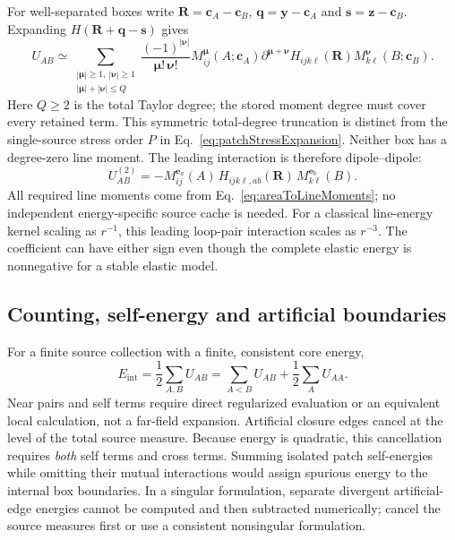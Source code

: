 For well-separated boxes write $\bm R=\bm c_A-\bm c_B$, $\bm q=\bm y-\bm c_A$ and $\bm s=\bm z-\bm c_B$. Expanding $H(\bm R+\bm q-\bm s)$ gives
\begin{equation}
 U_{AB}\simeq
 \sum_{\substack{|\boldsymbol\mu|\ge1,\ |\boldsymbol\nu|\ge1\\
 |\boldsymbol\mu|+|\boldsymbol\nu|\le Q}}
 \frac{(-1)^{|\boldsymbol\nu|}}{\boldsymbol\mu!\,\boldsymbol\nu!}
 M_{ij}^{\boldsymbol\mu}(A;\bm c_A)
 \partial^{\boldsymbol\mu+\boldsymbol\nu}H_{ij k\ell}(\bm R)
 M_{k\ell}^{\boldsymbol\nu}(B;\bm c_B).
 \label{eq:patchEnergyExpansion}
\end{equation}
Here $Q\ge2$ is the total Taylor degree; the stored moment degree must cover every retained term. This symmetric total-degree truncation is distinct from the single-source stress order $P$ in Eq.~\eqref{eq:patchStressExpansion}. Neither box has a degree-zero line moment. The leading interaction is therefore dipole--dipole:
\begin{equation}
 U_{AB}^{(2)}=-M_{ij}^{\bm e_a}(A)\,
 H_{ij k\ell,ab}(\bm R)\,M_{k\ell}^{\bm e_b}(B).
\end{equation}
All required line moments come from Eq.~\eqref{eq:areaToLineMoments}; no independent energy-specific source cache is needed. For a classical line-energy kernel scaling as $r^{-1}$, this leading loop-pair interaction scales as $r^{-3}$. The coefficient can have either sign even though the complete elastic energy is nonnegative for a stable elastic model.

\subsection{Counting, self-energy and artificial boundaries}
For a finite source collection with a finite, consistent core energy,
\begin{equation}
 E_{\mathrm{int}}=\frac12\sum_{A,B}U_{AB}
 =\sum_{A<B}U_{AB}+\frac12\sum_A U_{AA}.
 \label{eq:patchEnergyCounting}
\end{equation}
Near pairs and self terms require direct regularized evaluation or an equivalent local calculation, not a far-field expansion. Artificial closure edges cancel at the level of the total source measure. Because energy is quadratic, this cancellation requires \emph{both} self terms and cross terms. Summing isolated patch self-energies while omitting their mutual interactions would assign spurious energy to the internal box boundaries. In a singular formulation, separate divergent artificial-edge energies cannot be computed and then subtracted numerically; cancel the source measures first or use a consistent nonsingular formulation.

